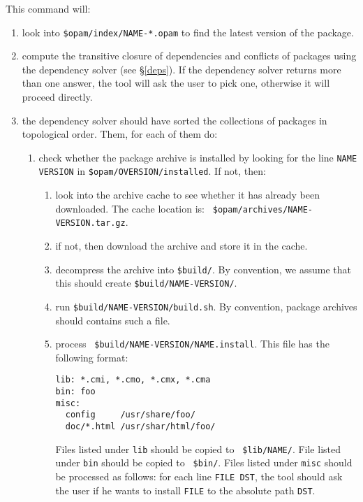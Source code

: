 \documentclass[a4paper,11pt]{article}
\begin{document}
This command will:

\begin{enumerate}

\item look into {\tt \$opam/index/NAME-*.opam} to find the latest
  version of the package.

\item compute the transitive closure of dependencies and conflicts of
  packages using the dependency solver (see \S\ref{deps}). If the
  dependency solver returns more than one answer, the tool will ask
  the user to pick one, otherwise it will proceed directly.

\item the dependency solver should have sorted the collections of
  packages in topological order. Them, for each of them do:

\begin{enumerate}

\item check whether the package archive is installed by looking for
  the line {\tt NAME VERSION} in {\tt \$opam/OVERSION/installed}. If
  not, then:

\begin{enumerate}

\item look into the archive cache to see whether it has already been
  downloaded. The cache location is: {\tt
    \$opam/archives/NAME-VERSION.tar.gz}.

\item if not, then download the archive and store it in the cache.

\item decompress the archive into {\tt \$build/}. By convention, we
  assume that this should create {\tt \$build/NAME-VERSION/}.

\item run {\tt \$build/NAME-VERSION/build.sh}. By convention, package
  archives should contains such a file.

\item process {\tt
  \$build/NAME-VERSION/NAME.install}\label{NAME.install}.  This file
  has the following format:

\begin{verbatim}
lib: *.cmi, *.cmo, *.cmx, *.cma
bin: foo
misc:
  config     /usr/share/foo/
  doc/*.html /usr/shar/html/foo/
\end{verbatim}

Files listed under {\tt lib} should be copied to {\tt
  \$lib/NAME/}. File listed under {\tt bin} should be copied to {\tt
  \$bin/}. Files listed under {\tt misc} should be processed as
follows: for each line {\tt FILE DST}, the tool should ask the user if
he wants to install {\tt FILE} to the absolute path {\tt DST}.

\end{enumerate}
\end{enumerate}
\end{enumerate}
\end{document}
